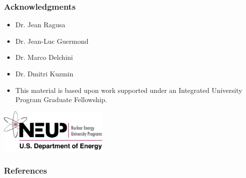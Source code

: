 \documentclass{beamer}
\begin{document}
%
%
%
%
\begin{frame}
\frametitle{Acknowledgments}

\begin{itemize}
   \item Dr. Jean Ragusa
   \item Dr. Jean-Luc Guermond
   \item Dr. Marco Delchini
   \item Dr. Dmitri Kuzmin
\end{itemize}
\begin{itemize}
   \item This material is based upon work supported under an Integrated University
      Program Graduate Fellowship.
\end{itemize}

\begin{center}
   \includegraphics[width=0.4\textwidth]{./figures/NEUP_Final_Logo_Version-09.jpg}
\end{center}
\end{frame}
\begin{frame}
\frametitle{References}




\end{frame}
\end{document}

